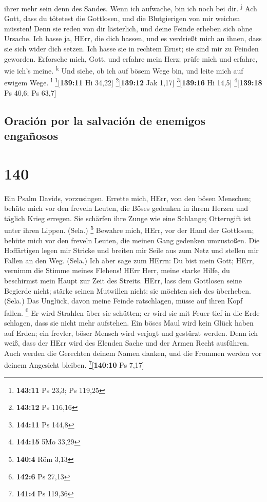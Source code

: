 ihrer mehr sein denn des Sandes. Wenn ich aufwache, bin ich noch bei
dir. \textsuperscript{j}  Ach Gott, dass du tötetest die
Gottlosen, und die Blutgierigen von mir weichen müssten! 
Denn sie reden von dir lästerlich, und deine Feinde erheben sich ohne
Ursache.  Ich hasse ja, HErr, die dich hassen, und es
verdrießt mich an ihnen, dass sie sich wider dich setzen.
 Ich hasse sie in rechtem Ernst; sie sind mir zu Feinden
geworden.  Erforsche mich, Gott, und erfahre mein Herz;
prüfe mich und erfahre, wie ich's meine. \textsuperscript{k}
 Und siehe, ob ich auf bösem Wege bin, und leite mich auf
ewigem Wege. \textsuperscript{l} \footnote{\textbf{143:11} Ps 23,3; Ps
  119,25}{[}\textbf{139:11} Hi 34,22{]} \footnote{\textbf{143:12} Ps
  116,16}{[}\textbf{139:12} Jak 1,17{]} \footnote{\textbf{144:11} Ps
  144,8}{[}\textbf{139:16} Hi 14,5{]} \footnote{\textbf{144:15} 5Mo
  33,29}{[}\textbf{139:18} Ps 40,6; Ps 63,7{]}

\hypertarget{oraciuxf3n-por-la-salvaciuxf3n-de-enemigos-engauxf1osos}{%
\subsection{Oración por la salvación de enemigos
engañosos}\label{oraciuxf3n-por-la-salvaciuxf3n-de-enemigos-engauxf1osos}}

\hypertarget{section-139}{%
\section{140}\label{section-139}}

 Ein Psalm Davids, vorzusingen.  Errette
mich, HErr, von den bösen Menschen; behüte mich vor den freveln Leuten,
 die Böses gedenken in ihrem Herzen und täglich Krieg
erregen.  Sie schärfen ihre Zunge wie eine Schlange;
Otterngift ist unter ihren Lippen. (Sela.) \footnote{\textbf{140:4} Röm
  3,13}  Bewahre mich, HErr, vor der Hand der Gottlosen;
behüte mich vor den freveln Leuten, die meinen Gang gedenken umzustoßen.
 Die Hoffärtigen legen mir Stricke und breiten mir Seile
aus zum Netz und stellen mir Fallen an den Weg. (Sela.) 
Ich aber sage zum HErrn: Du bist mein Gott; HErr, vernimm die Stimme
meines Flehens!  HErr Herr, meine starke Hilfe, du
beschirmst mein Haupt zur Zeit des Streits.  HErr, lass
dem Gottlosen seine Begierde nicht; stärke seinen Mutwillen nicht: sie
möchten sich des überheben. (Sela.)  Das Unglück, davon
meine Feinde ratschlagen, müsse auf ihren Kopf fallen. \footnote{\textbf{142:6}
  Ps 27,13}  Er wird Strahlen über sie schütten; er wird
sie mit Feuer tief in die Erde schlagen, dass sie nicht mehr aufstehen.
 Ein böses Maul wird kein Glück haben auf Erden; ein
frevler, böser Mensch wird verjagt und gestürzt werden. 
Denn ich weiß, dass der HErr wird des Elenden Sache und der Armen Recht
ausführen.  Auch werden die Gerechten deinem Namen
danken, und die Frommen werden vor deinem Angesicht bleiben.
\footnote{\textbf{141:4} Ps 119,36}{[}\textbf{140:10} Ps 7,17{]}


